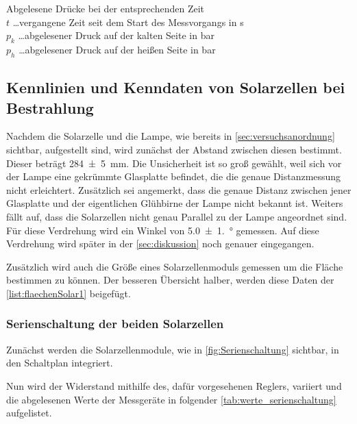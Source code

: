 \documentclass[12pt,english,ngerman]{scrartcl}
\begin{document}
\begin{table}[H]
	\caption[Abgelesene Drücke bei der entsprechenden Zeit]{ Abgelesene Drücke bei der
		entsprechenden Zeit                                            \\
		$t$ \dots vergangene Zeit seit dem Start des Messvorgangs in s \\
		$p_k$ \dots abgelesener Druck auf der kalten Seite in bar      \\
		$p_h$ \dots abgelesener Druck auf der heißen Seite in bar
	}\label{tab:drucke}
	\centering
	
\end{table}

\subsection{Kennlinien und Kenndaten von Solarzellen bei Bestrahlung}

Nachdem die Solarzelle und die Lampe, wie bereits in
\autoref{sec:versuchsanordnung} sichtbar, aufgestellt sind, wird zunächst der
Abstand zwischen diesen bestimmt. Dieser beträgt \SI{284(5)}{\mm}. Die
Unsicherheit ist so groß gewählt, weil sich vor der Lampe eine gekrümmte
Glasplatte befindet, die die genaue Distanzmessung nicht erleichtert.
Zusätzlich sei angemerkt, dass die genaue Distanz zwischen jener Glasplatte und
der eigentlichen Glühbirne der Lampe nicht bekannt ist. Weiters fällt auf, dass
die Solarzellen nicht genau Parallel zu der Lampe angeordnet sind. Für diese
Verdrehung wird ein Winkel von \SI{5.0(1.0)}{\degree} gemessen. Auf diese
Verdrehung wird später in der \autoref{sec:diskussion} noch genauer
eingegangen.

Zusätzlich wird auch die Größe eines Solarzellenmoduls gemessen um die Fläche
bestimmen zu können. Der besseren Übersicht halber, werden diese Daten der
\cref{list:flaechenSolar1} beigefügt.

\subsubsection{Serienschaltung der beiden Solarzellen}

Zunächst werden die Solarzellenmodule, wie in \autoref{fig:Serienschaltung}
sichtbar, in den Schaltplan integriert.

Nun wird der Widerstand mithilfe des, dafür vorgesehenen Reglers, variiert und
die abgelesenen Werte der Messgeräte in folgender
\autoref{tab:werte_serienschaltung} aufgelistet.
\end{document}
